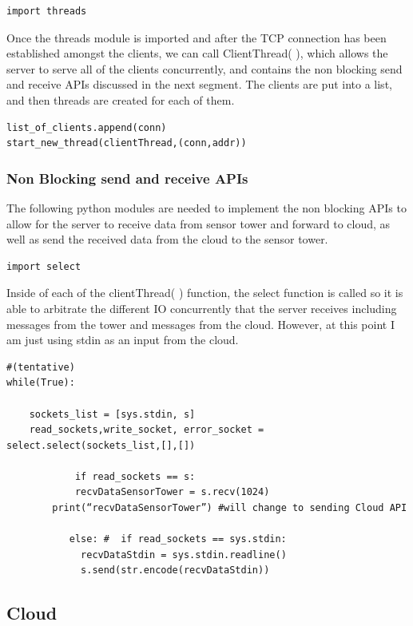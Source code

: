 \documentclass[paper=a4, fontsize=12pt]{scrartcl}
\numberwithin{equation}{section}		%
\numberwithin{figure}{section}			%
\numberwithin{table}{section}				%
\begin{document}
\begin{verbatim}
import threads
\end{verbatim}
Once the threads module is imported and after the TCP connection has been established amongst the clients, we can call ClientThread( ), which allows the server to serve all of the clients concurrently, and contains the non blocking send and receive APIs discussed in the next segment. The clients are put into a list, and then threads are created for each of them.

\begin{verbatim}
list_of_clients.append(conn)
start_new_thread(clientThread,(conn,addr))   
\end{verbatim}

\subsubsection{Non Blocking send and receive APIs}

The following python modules are needed to implement the non blocking APIs to allow for the server to receive data from sensor tower and forward to cloud, as well as send the received data from the cloud to the sensor tower. 

\begin{verbatim}
import select
\end{verbatim}

Inside of each of the clientThread( ) function, the select function is called so it is able to arbitrate the different IO concurrently that the server receives including messages from the tower and messages from the cloud. However, at this point I am just using stdin as an input from the cloud.

\begin{verbatim}
#(tentative)
while(True):

	sockets_list = [sys.stdin, s]
	read_sockets,write_socket, error_socket = select.select(sockets_list,[],[])

    	    if read_sockets == s:
           	recvDataSensorTower = s.recv(1024)
		print(“recvDataSensorTower”) #will change to sending Cloud API

     	   else: #  if read_sockets == sys.stdin:
       	   	 recvDataStdin = sys.stdin.readline()
           	 s.send(str.encode(recvDataStdin))
\end{verbatim}
\subsection{Cloud}
\end{document}

